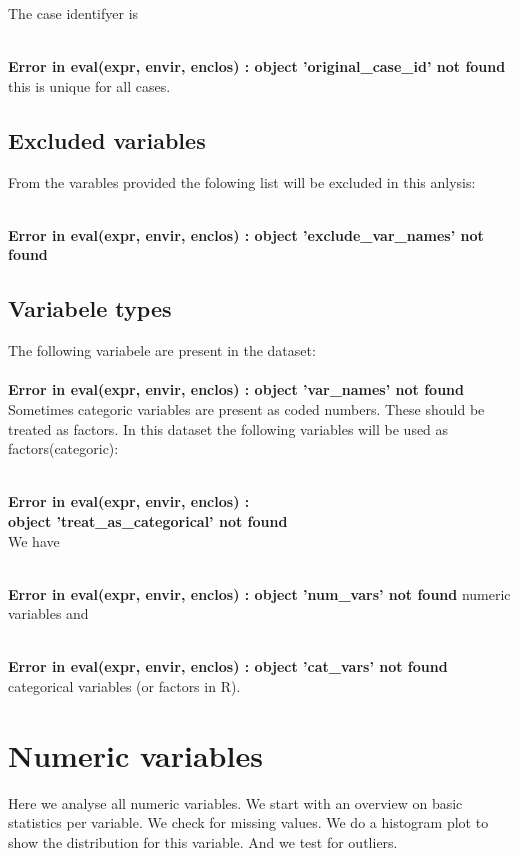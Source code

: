 \documentclass[10pt,a4paper,titlepage]{report}\usepackage{graphicx, color}
\begin{document}
The case identifyer is 

{\ttfamily\noindent\bfseries\textcolor{errorcolor}{\\Error in eval(expr, envir, enclos) : object 'original\_case\_id' not found}} this is unique for all cases.

\subsection{Excluded variables}
From the varables provided the folowing list will be excluded in this anlysis: 

{\ttfamily\noindent\bfseries\textcolor{errorcolor}{\\Error in eval(expr, envir, enclos) : object 'exclude\_var\_names' not found}}

\subsection{Variabele types}


The following variabele are present in the dataset:\\


{\ttfamily\noindent\bfseries\textcolor{errorcolor}{\\Error in eval(expr, envir, enclos) : object 'var\_names' not found}} 
\\
Sometimes categoric variables are present as coded numbers. These should be treated as factors.
In this dataset the following variables will be used as factors(categoric): 

{\ttfamily\noindent\bfseries\textcolor{errorcolor}{\\Error in eval(expr, envir, enclos) : \\  object 'treat\_as\_categorical' not found}}
\\
We have 

{\ttfamily\noindent\bfseries\textcolor{errorcolor}{\\Error in eval(expr, envir, enclos) : object 'num\_vars' not found}} numeric variables and 

{\ttfamily\noindent\bfseries\textcolor{errorcolor}{\\Error in eval(expr, envir, enclos) : object 'cat\_vars' not found}} categorical variables (or factors in R).
\newpage
\section{Numeric variables}
Here we analyse all numeric variables. We start with an overview on basic statistics per variable. We check for missing values. We do a histogram plot to show the distribution for this variable. And we test for outliers.
\end{document}
